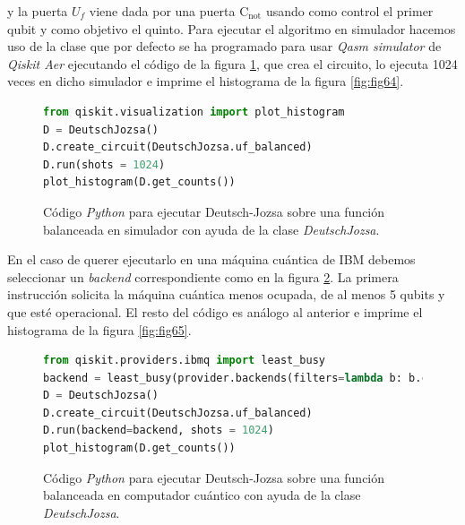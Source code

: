 y la puerta $U_f$ viene dada por una puerta C$_\textrm{not}$ usando como control el primer qubit y como objetivo el quinto. Para ejecutar el algoritmo en simulador hacemos uso de la clase que por defecto se ha programado para usar \textit{Qasm simulator} de \textit{Qiskit Aer} ejecutando el código de la figura \ref{code:code62}, que crea el circuito, lo ejecuta 1024 veces en dicho simulador e imprime el histograma de la figura \ref{fig:fig64}.
\begin{figure}[htb!]
\begin{lstlisting}[language=Python]
from qiskit.visualization import plot_histogram
D = DeutschJozsa()
D.create_circuit(DeutschJozsa.uf_balanced)
D.run(shots = 1024)
plot_histogram(D.get_counts())
\end{lstlisting}
\caption{Código \textit{Python} para ejecutar Deutsch-Jozsa sobre una función balanceada en simulador con ayuda de la clase \textit{DeutschJozsa}.}
\label{code:code62}
\end{figure}

En el caso de querer ejecutarlo en una máquina cuántica de IBM debemos seleccionar un \textit{backend} correspondiente como en la figura \ref{code:code63}. La primera instrucción solicita la máquina cuántica menos ocupada, de al menos 5 qubits y que esté operacional. El resto del código es análogo al anterior e imprime el histograma de la figura \ref{fig:fig65}.
\begin{figure}[htb!]
\begin{lstlisting}[language=Python]
from qiskit.providers.ibmq import least_busy
backend = least_busy(provider.backends(filters=lambda b: b.configuration().n_qubits >= 5 and not b.configuration().simulator and b.status().operational==True))
D = DeutschJozsa()
D.create_circuit(DeutschJozsa.uf_balanced)
D.run(backend=backend, shots = 1024)
plot_histogram(D.get_counts())
\end{lstlisting}
\caption{Código \textit{Python} para ejecutar Deutsch-Jozsa sobre una función balanceada en computador cuántico con ayuda de la clase \textit{DeutschJozsa}.}
\label{code:code63}
\end{figure}

